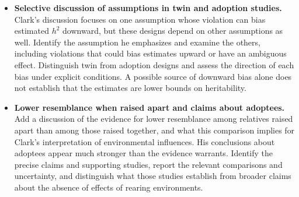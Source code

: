 \begin{itemize}
from them. Preserve this distinction when assessing both contributions
and limitations.
Often Clark's conclusions do not follow from the evidence he presents.
This does not establish that the conclusions are wrong; it means they
have not been established nearly as credibly as he suggests. Develop
this distinction consistently throughout the review. Working analogy
to consider: his apparent resistance to alternative explanations recalls,
in the opposite direction, the stubbornness of Lysenkoite social
scientists who instinctively reject evidence allowing any role for
genetics. The target is asymmetric standards of evidence, not an
equivalence of substantive views. He also sometimes exaggerates how
strongly his tests discriminate between genetic and cultural models;
symmetry and regression toward the mean are key examples to document.
Examine his claims that school reforms yield no benefits, distinguishing
evidence of no benefit from failure to establish a benefit. Track shifts
between policy criteria: does a reform help anyone or improve average
outcomes, does it help the poor, does it reduce inequality, and does it
increase or reduce mobility? These are distinct questions, and a failure
on one criterion does not establish failure on the others. Collect
specific passages showing where the criterion changes within an argument.
\item \textbf{Selective discussion of assumptions in twin and adoption studies.}
Clark's discussion focuses on one assumption whose violation can bias
estimated $h^2$ downward, but these designs depend on other assumptions
as well. Identify the assumption he emphasizes and examine the others,
including violations that could bias estimates upward or have an
ambiguous effect. Distinguish twin from adoption designs and assess the
direction of each bias under explicit conditions. A possible source of
downward bias alone does not establish that the estimates are lower
bounds on heritability.
\item \textbf{Lower resemblance when raised apart and claims about adoptees.}
Add a discussion of the evidence for lower resemblance among relatives
raised apart than among those raised together, and what this comparison
implies for Clark's interpretation of environmental influences. His
conclusions about adoptees appear much stronger than the evidence
warrants. Identify the precise claims and supporting studies, report
the relevant comparisons and uncertainty, and distinguish what those
studies establish from broader claims about the absence of effects of
rearing environments.

\end{itemize}
